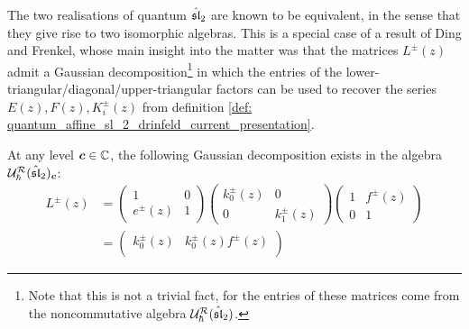         The two realisations of quantum $\hat{\sl}_2$ are known to be equivalent, in the sense that they give rise to two isomorphic algebras. This is a special case of a result of Ding and Frenkel, whose main insight into the matter was that the matrices $L^{\pm}(z)$ admit a Gaussian decomposition\footnote{Note that this is not a trivial fact, for the entries of these matrices come from the noncommutative algebra $\calU_{\hbar}^{\calR}(\hat{\sl}_2)$.} in which the entries of the lower-triangular/diagonal/upper-triangular factors can be used to recover the series $E(z), F(z), K_i^{\pm}(z)$ from definition \ref{def: quantum_affine_sl_2_drinfeld_current_presentation}.
        \begin{lemma} \label{lemma: ding_frenkel_isomorphism_quantum_affine_sl_2}
            At any level $\level \in \bbC$, the following Gaussian decomposition exists in the algebra $\calU_{\hbar}^{\calR}(\hat{\sl}_2)_{\level}$:
                \begin{equation} \label{equation: quantum_affine_sl_2_monodromy_matrices_gaussian_decompositions}
                    \begin{aligned}
                        L^{\pm}(z)
                        & =
                            \begin{pmatrix}
                                1 & 0
                                \\
                                e^{\pm}(z) & 1
                            \end{pmatrix}
                            \begin{pmatrix}
                                k_0^{\pm}(z) & 0
                                \\
                                0 & k_1^{\pm}(z)
                            \end{pmatrix}
                            \begin{pmatrix}
                                1 & f^{\pm}(z)
                                \\
                                0 & 1
                            \end{pmatrix}
                        \\
                        & =
                            \begin{pmatrix}
                                k_0^{\pm}(z) & k_0^{\pm}(z) f^{\pm}(z)
                                \\

\end{pmatrix}
\end{aligned}
\end{equation}
\end{lemma}
